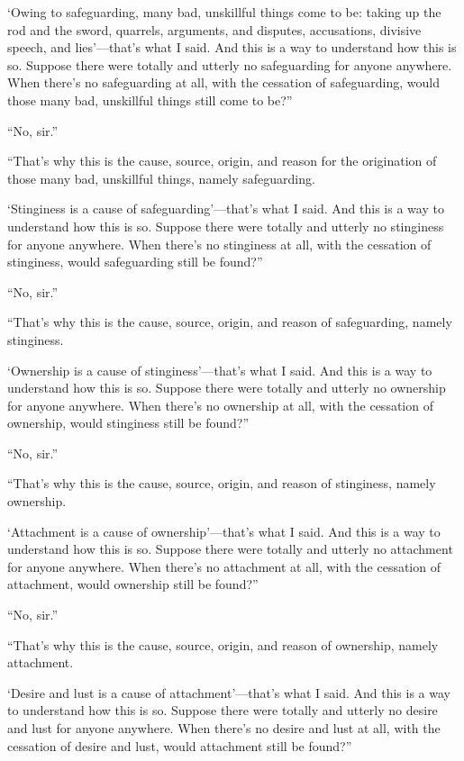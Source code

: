 \documentclass[12pt,openany]{book}%
\begin{document}
‘Owing to safeguarding, many bad, unskillful things come to be: taking up the rod and the sword, quarrels, arguments, and disputes, accusations, divisive speech, and lies’—that’s what I said. And this is a way to understand how this is so. Suppose there were totally and utterly no safeguarding for anyone anywhere. When there’s no safeguarding at all, with the cessation of safeguarding, would those many bad, unskillful things still come to be?” 

“No, sir.” 

“That’s why this is the cause, source, origin, and reason for the origination of those many bad, unskillful things, namely safeguarding. 

‘Stinginess is a cause of safeguarding’—that’s what I said. And this is a way to understand how this is so. Suppose there were totally and utterly no stinginess for anyone anywhere. When there’s no stinginess at all, with the cessation of stinginess, would safeguarding still be found?” 

“No, sir.” 

“That’s why this is the cause, source, origin, and reason of safeguarding, namely stinginess. 

‘Ownership is a cause of stinginess’—that’s what I said. And this is a way to understand how this is so. Suppose there were totally and utterly no ownership for anyone anywhere. When there’s no ownership at all, with the cessation of ownership, would stinginess still be found?” 

“No, sir.” 

“That’s why this is the cause, source, origin, and reason of stinginess, namely ownership. 

‘Attachment is a cause of ownership’—that’s what I said. And this is a way to understand how this is so. Suppose there were totally and utterly no attachment for anyone anywhere. When there’s no attachment at all, with the cessation of attachment, would ownership still be found?” 

“No, sir.” 

“That’s why this is the cause, source, origin, and reason of ownership, namely attachment. 

‘Desire and lust is a cause of attachment’—that’s what I said. And this is a way to understand how this is so. Suppose there were totally and utterly no desire and lust for anyone anywhere. When there’s no desire and lust at all, with the cessation of desire and lust, would attachment still be found?” 
\end{document}
